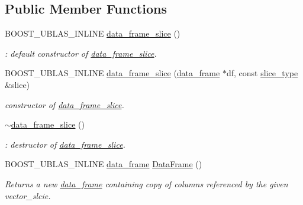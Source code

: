 \subsection*{Public Member Functions}
\begin{DoxyCompactItemize}
\item 
B\+O\+O\+S\+T\+\_\+\+U\+B\+L\+A\+S\+\_\+\+I\+N\+L\+I\+NE \hyperlink{classboost_1_1numeric_1_1ublas_1_1data__frame__slice_a08f7552cc358a576165c6394999dc878}{data\+\_\+frame\+\_\+slice} ()
\begin{DoxyCompactList}\small\item\em \+: default constructor of \hyperlink{classboost_1_1numeric_1_1ublas_1_1data__frame__slice}{data\+\_\+frame\+\_\+slice}. \end{DoxyCompactList}\item 
B\+O\+O\+S\+T\+\_\+\+U\+B\+L\+A\+S\+\_\+\+I\+N\+L\+I\+NE \hyperlink{classboost_1_1numeric_1_1ublas_1_1data__frame__slice_a4f440936f399c24489b37b2104f7a768}{data\+\_\+frame\+\_\+slice} (\hyperlink{classboost_1_1numeric_1_1ublas_1_1data__frame}{data\+\_\+frame} $\ast$df, const \hyperlink{classboost_1_1numeric_1_1ublas_1_1data__frame__slice_a218c8259c584054d643724fd8f74450c}{slice\+\_\+type} \&slice)
\begin{DoxyCompactList}\small\item\em constructor of \hyperlink{classboost_1_1numeric_1_1ublas_1_1data__frame__slice}{data\+\_\+frame\+\_\+slice}. \end{DoxyCompactList}\item 
\hyperlink{classboost_1_1numeric_1_1ublas_1_1data__frame__slice_a537d1217f1a7071fcc3c8535a507524f}{$\sim$data\+\_\+frame\+\_\+slice} ()
\begin{DoxyCompactList}\small\item\em \+: destructor of \hyperlink{classboost_1_1numeric_1_1ublas_1_1data__frame__slice}{data\+\_\+frame\+\_\+slice}. \end{DoxyCompactList}\item 
B\+O\+O\+S\+T\+\_\+\+U\+B\+L\+A\+S\+\_\+\+I\+N\+L\+I\+NE \hyperlink{classboost_1_1numeric_1_1ublas_1_1data__frame}{data\+\_\+frame} \hyperlink{classboost_1_1numeric_1_1ublas_1_1data__frame__slice_a8daaa1c0828185701ca1bbddfe29af03}{Data\+Frame} ()
\begin{DoxyCompactList}\small\item\em Returns a new \hyperlink{classboost_1_1numeric_1_1ublas_1_1data__frame}{data\+\_\+frame} containing copy of columns referenced by the given vector\+\_\+slcie. \end{DoxyCompactList}\item 

\end{DoxyCompactItemize}
